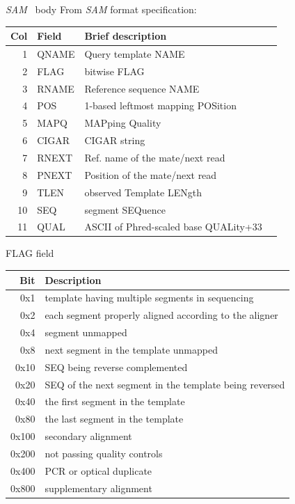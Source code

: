 \documentclass{beamer}
\newcommand{\sam}{\textit{SAM}}
\begin{document}

\begin{frame}{\sam~ body}
  From \textit{SAM} format specification:
  \begin{tabular}{rlll}
    \hline
    {\bf Col} & {\bf Field} & {\bf Brief description} \\
    \hline
    1 & {\sf QNAME} & Query template NAME\\
    2 & {\sf FLAG} & bitwise FLAG \\
    3 & {\sf RNAME} & Reference sequence NAME\\
    4 & {\sf POS} & 1-based leftmost mapping POSition \\
    5 & {\sf MAPQ} & MAPping Quality \\
    6 & {\sf CIGAR} & CIGAR string \\
    7 & {\sf RNEXT} & Ref. name of the mate/next read\\
    8 & {\sf PNEXT} & Position of the mate/next read \\
    9 & {\sf TLEN} & observed Template LENgth \\
    10 & {\sf SEQ} & segment SEQuence\\
    11 & {\sf QUAL} & ASCII of Phred-scaled base QUALity+33 \\
    \hline
  \end{tabular}
\end{frame}



\begin{frame}{FLAG field}
  \begin{tabular}{rl}
    \hline
    Bit & Description\\
    \hline
    0x1 &  template having multiple segments in sequencing \\
    0x2 &  each segment properly aligned according to the aligner \\
    0x4 &  segment unmapped \\
    0x8 &  next segment in the template unmapped \\
    0x10 &  {\sf SEQ} being reverse complemented \\
    0x20 &  {\sf SEQ} of the next segment in the template being reversed \\
    0x40 &  the first segment in the template \\
    0x80 &  the last segment in the template \\
    0x100 &  secondary alignment \\
    0x200 &  not passing quality controls \\
    0x400 &  PCR or optical duplicate \\
    0x800 &  supplementary alignment \\
    \hline
  \end{tabular}
\end{frame}
\end{document}
